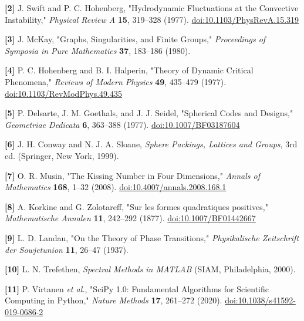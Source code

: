 \documentclass[a4paper,11pt]{article}
\begin{document}
\label{ref2}
\noindent \textbf{[2]} J. Swift and P. C. Hohenberg, "Hydrodynamic Fluctuations at the Convective Instability," \textit{Physical Review A} \textbf{15}, 319–328 (1977). \href{https://doi.org/10.1103/PhysRevA.15.319}{doi:10.1103/PhysRevA.15.319}


\label{ref3}
\noindent \textbf{[3]} J. McKay, "Graphs, Singularities, and Finite Groups," \textit{Proceedings of Symposia in Pure Mathematics} \textbf{37}, 183–186 (1980).


\label{ref4}
\noindent \textbf{[4]} P. C. Hohenberg and B. I. Halperin, "Theory of Dynamic Critical Phenomena," \textit{Reviews of Modern Physics} \textbf{49}, 435–479 (1977). \href{https://doi.org/10.1103/RevModPhys.49.435}{doi:10.1103/RevModPhys.49.435}


\label{ref5}
\noindent \textbf{[5]} P. Delsarte, J. M. Goethals, and J. J. Seidel, "Spherical Codes and Designs," \textit{Geometriae Dedicata} \textbf{6}, 363–388 (1977). \href{https://doi.org/10.1007/BF03187604}{doi:10.1007/BF03187604}


\label{ref6}
\noindent \textbf{[6]} J. H. Conway and N. J. A. Sloane, \textit{Sphere Packings, Lattices and Groups}, 3rd ed. (Springer, New York, 1999).


\label{ref7}
\noindent \textbf{[7]} O. R. Musin, "The Kissing Number in Four Dimensions," \textit{Annals of Mathematics} \textbf{168}, 1–32 (2008). \href{https://doi.org/10.4007/annals.2008.168.1}{doi:10.4007/annals.2008.168.1}


\label{ref8}
\noindent \textbf{[8]} A. Korkine and G. Zolotareff, "Sur les formes quadratiques positives," \textit{Mathematische Annalen} \textbf{11}, 242–292 (1877). \href{https://doi.org/10.1007/BF01442667}{doi:10.1007/BF01442667}


\label{ref9}
\noindent \textbf{[9]} L. D. Landau, "On the Theory of Phase Transitions," \textit{Physikalische Zeitschrift der Sowjetunion} \textbf{11}, 26–47 (1937).


\label{ref10}
\noindent \textbf{[10]} L. N. Trefethen, \textit{Spectral Methods in MATLAB} (SIAM, Philadelphia, 2000).


\label{ref11}
\noindent \textbf{[11]} P. Virtanen \textit{et al.}, "SciPy 1.0: Fundamental Algorithms for Scientific Computing in Python," \textit{Nature Methods} \textbf{17}, 261–272 (2020). \href{https://doi.org/10.1038/s41592-019-0686-2}{doi:10.1038/s41592-019-0686-2}
\end{document}
